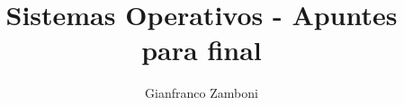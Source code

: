 


\title{Sistemas Operativos - Apuntes para final}
\author{Gianfranco Zamboni}

\usepackage[backend=biber,style=chem-acs,sorting=none]{biblatex}
\nocite{*}




\setcounter{tocdepth}{2}


	\maketitle
	\tableofcontents

\newpage


\newpage


\newpage


\newpage


\newpage


\newpage


\newpage

	


